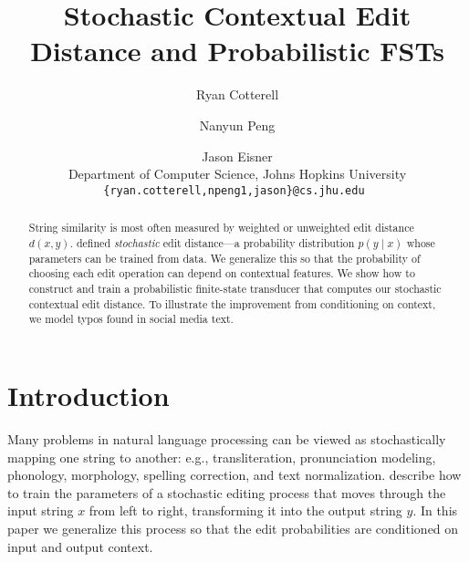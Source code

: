 \documentclass[11pt,letterpaper]{article}
\title{Stochastic Contextual Edit Distance and Probabilistic FSTs}
\author{Ryan Cotterell \and Nanyun Peng \and Jason Eisner \\
   Department of Computer Science, Johns Hopkins University \\
  {\tt \{ryan.cotterell,npeng1,jason\}@cs.jhu.edu }
}
\newcommand{\jason}[1]{\todo[color=blue!40,author=Jason]{#1}}
\newcommand{\SkipForSpace}[1]{}
\begin{document}
\maketitle


\begin{abstract}
  String similarity is most often measured by weighted or unweighted edit distance $d(x,y)$.   defined 
{\em stochastic} edit distance---a probability distribution $p(y \mid x)$ whose parameters can be trained from data.  We generalize this
so that the probability of choosing each edit operation can depend on contextual features.  We show how to construct and train a probabilistic finite-state transducer that computes our stochastic contextual edit distance.  
To illustrate the improvement from conditioning on context,
we model typos found in social media text. 
\end{abstract}

\section{Introduction}

Many problems in natural language processing can be viewed as stochastically mapping one string to another: e.g., transliteration, pronunciation modeling, phonology, morphology, spelling correction, and text normalization.   describe how to train the parameters of a stochastic editing process that moves through the input string $x$ from left to right, transforming it into the output string $y$.  In this paper we generalize this process so that the edit probabilities are conditioned on input and output context. 

\SkipForSpace{To give a simple example, consider the case of mapping an English word to 
its pronunication.  The difference between \emph{plan} and \emph{plane} 
lies in presence of a silent \emph{e}. We want \emph{a} $\mapsto$ 
/\textipa{\ae}/ in the former case, but \emph{a} $\mapsto$ /e\textipa{I}/
in the later. A finite-state transducer needs
access to right input context in order to correctly learn proper
mapping.}
\end{document}
